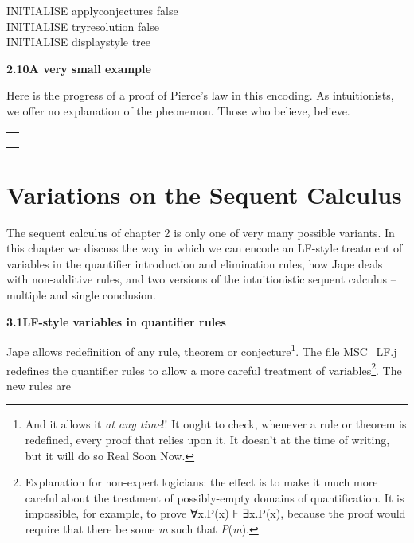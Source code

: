 \documentclass[11pt]{book}
\newcommand{\tab}{\hspace{5mm}}
\begin{document}
INITIALISE applyconjectures false\\
INITIALISE tryresolution false\\
INITIALISE displaystyle tree


\textbf{{\large 2.10\tab A very small example}}


Here is the progress of a proof of Pierce's law in this encoding. As intuitionists, we offer no explanation of the pheonemon. Those who believe, believe.\\


\begin{tabular}{|p{2.347in}|}
\hline
{\raggedright }\\
\hline
{\raggedright }\\
\hline
{\raggedright }\\
\hline
{\raggedright }\\
\hline
\end{tabular}



\chapter{Variations on the Sequent Calculus}


The sequent calculus of chapter 2 is only one of very many possible variants. In this chapter we discuss the way in which we can encode an LF-style treatment of variables in the quantifier introduction and elimination rules, how Jape deals with non-additive rules, and two versions of the intuitionistic sequent calculus -- multiple and single conclusion.


\textbf{{\large 3.1\tab LF-style variables in quantifier rules}}


Jape allows redefinition of any rule, theorem or conjecture\footnote{And it allows it \textit{at any time}!! It ought to check, whenever a rule or theorem is redefined, every proof that relies upon it. It doesn't at the time of writing, but it will do so Real Soon Now.}. The file MSC\_LF.j redefines the quantifier rules to allow a more careful treatment of variables\footnote{Explanation for non-expert logicians: the effect is to make it much more careful about the treatment of possibly-empty domains of quantification. It is impossible, for example, to prove {\small ∀x.P(x) ⊦ ∃x.P(x)}, because the proof would require that there be some \textit{m} such that \textit{P}(\textit{m}).}. The new rules are\\
\end{document}
